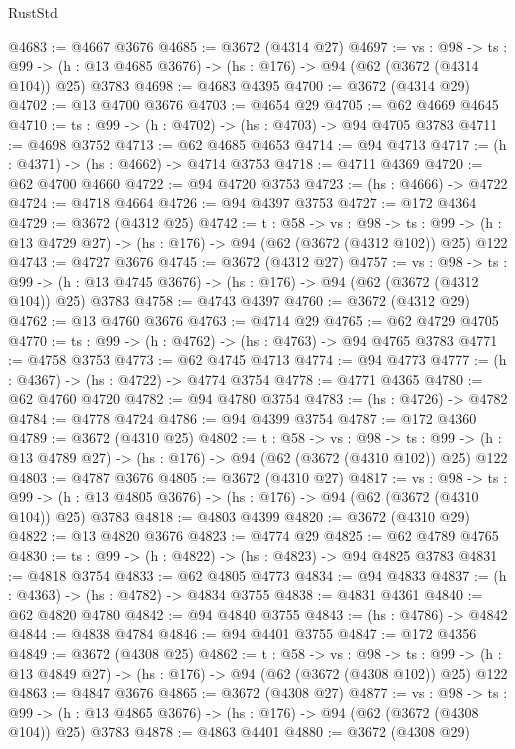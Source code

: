 \begin{lexlean}{RustStd}
\begin{coremodule}
{\begin{coremodule}
{{{{{{{{{@4683 := @4667 @3676
@4685 := @3672 (@4314 @27)
@4697 := {vs : @98} ->
  {ts : @99} -> (h : @13 @4685 @3676) -> (hs : @176) -> @94 (@62 (@3672 (@4314 @104)) @25) @3783
@4698 := @4683 @4395
@4700 := @3672 (@4314 @29)
@4702 := @13 @4700 @3676
@4703 := @4654 @29
@4705 := @62 @4669 @4645
@4710 := {ts : @99} -> (h : @4702) -> (hs : @4703) -> @94 @4705 @3783
@4711 := @4698 @3752
@4713 := @62 @4685 @4653
@4714 := @94 @4713
@4717 := (h : @4371) -> (hs : @4662) -> @4714 @3753
@4718 := @4711 @4369
@4720 := @62 @4700 @4660
@4722 := @94 @4720 @3753
@4723 := (hs : @4666) -> @4722
@4724 := @4718 @4664
@4726 := @94 @4397 @3753
@4727 := @172 @4364
@4729 := @3672 (@4312 @25)
@4742 := {t : @58} ->
  {vs : @98} ->
  {ts : @99} -> (h : @13 @4729 @27) -> (hs : @176) -> @94 (@62 (@3672 (@4312 @102)) @25) @122
@4743 := @4727 @3676
@4745 := @3672 (@4312 @27)
@4757 := {vs : @98} ->
  {ts : @99} -> (h : @13 @4745 @3676) -> (hs : @176) -> @94 (@62 (@3672 (@4312 @104)) @25) @3783
@4758 := @4743 @4397
@4760 := @3672 (@4312 @29)
@4762 := @13 @4760 @3676
@4763 := @4714 @29
@4765 := @62 @4729 @4705
@4770 := {ts : @99} -> (h : @4762) -> (hs : @4763) -> @94 @4765 @3783
@4771 := @4758 @3753
@4773 := @62 @4745 @4713
@4774 := @94 @4773
@4777 := (h : @4367) -> (hs : @4722) -> @4774 @3754
@4778 := @4771 @4365
@4780 := @62 @4760 @4720
@4782 := @94 @4780 @3754
@4783 := (hs : @4726) -> @4782
@4784 := @4778 @4724
@4786 := @94 @4399 @3754
@4787 := @172 @4360
@4789 := @3672 (@4310 @25)
@4802 := {t : @58} ->
  {vs : @98} ->
  {ts : @99} -> (h : @13 @4789 @27) -> (hs : @176) -> @94 (@62 (@3672 (@4310 @102)) @25) @122
@4803 := @4787 @3676
@4805 := @3672 (@4310 @27)
@4817 := {vs : @98} ->
  {ts : @99} -> (h : @13 @4805 @3676) -> (hs : @176) -> @94 (@62 (@3672 (@4310 @104)) @25) @3783
@4818 := @4803 @4399
@4820 := @3672 (@4310 @29)
@4822 := @13 @4820 @3676
@4823 := @4774 @29
@4825 := @62 @4789 @4765
@4830 := {ts : @99} -> (h : @4822) -> (hs : @4823) -> @94 @4825 @3783
@4831 := @4818 @3754
@4833 := @62 @4805 @4773
@4834 := @94 @4833
@4837 := (h : @4363) -> (hs : @4782) -> @4834 @3755
@4838 := @4831 @4361
@4840 := @62 @4820 @4780
@4842 := @94 @4840 @3755
@4843 := (hs : @4786) -> @4842
@4844 := @4838 @4784
@4846 := @94 @4401 @3755
@4847 := @172 @4356
@4849 := @3672 (@4308 @25)
@4862 := {t : @58} ->
  {vs : @98} ->
  {ts : @99} -> (h : @13 @4849 @27) -> (hs : @176) -> @94 (@62 (@3672 (@4308 @102)) @25) @122
@4863 := @4847 @3676
@4865 := @3672 (@4308 @27)
@4877 := {vs : @98} ->
  {ts : @99} -> (h : @13 @4865 @3676) -> (hs : @176) -> @94 (@62 (@3672 (@4308 @104)) @25) @3783
@4878 := @4863 @4401
@4880 := @3672 (@4308 @29)
}}}}}}}}}
\end{coremodule}}
\end{coremodule}
\end{lexlean}
